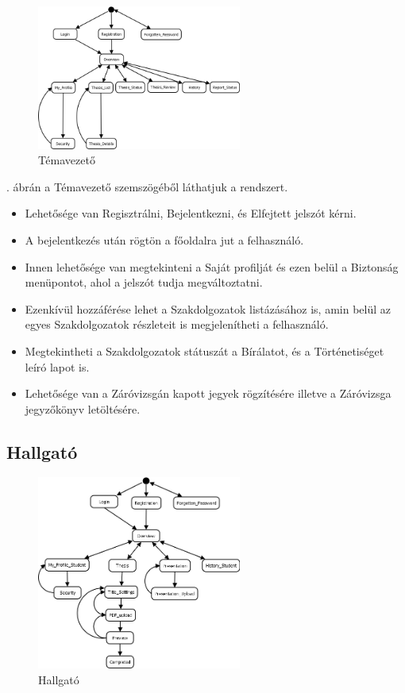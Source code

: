 \documentclass[a4paper,12pt]{article}
\begin{document}
\begin{figure}[h!]
	\centering
	\includegraphics[width=0.6\textwidth]{images/Lapok_kozotti_atmenetek/Temavezeto.png}
	\caption{Témavezető}
	\label{fig:Temavezeto}
\end{figure}

. ábrán a Témavezető szemszögéből láthatjuk a rendszert.

\begin{itemize}
	\item Lehetősége van Regisztrálni, Bejelentkezni, és Elfejtett jelszót kérni. 
	\item A bejelentkezés után rögtön a főoldalra jut a felhasználó. 
	\item Innen lehetősége van megtekinteni a Saját profilját és ezen belül a Biztonság menüpontot, ahol a jelszót tudja megváltoztatni. 
	\item Ezenkívül hozzáférése lehet a Szakdolgozatok listázásához is, amin belül az egyes Szakdolgozatok részleteit is megjelenítheti a felhasználó. 
	\item Megtekintheti a Szakdolgozatok státuszát a Bírálatot, és a Történetiséget leíró lapot is. 
	\item Lehetősége van a Záróvizsgán kapott jegyek rögzítésére illetve a Záróvizsga jegyzőkönyv letöltésére. 
\end{itemize}

\subsection{Hallgató}

\begin{figure}[h!]
	\centering
	\includegraphics[width=0.6\textwidth]{images/Lapok_kozotti_atmenetek/Hallgato.png}
	\caption{Hallgató}
	\label{fig:Hallgato}
\end{figure}
\end{document}
